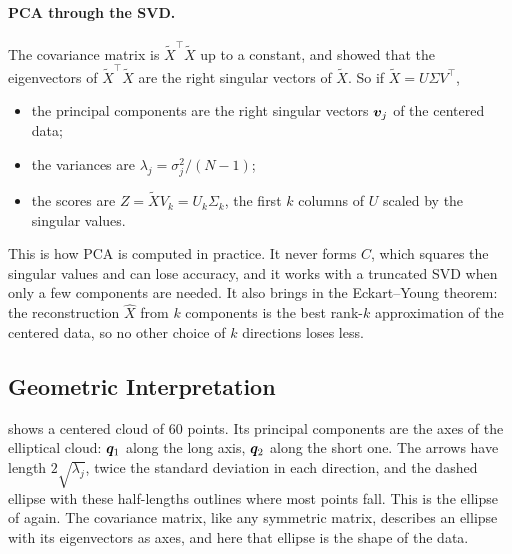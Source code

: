 \paragraph{PCA through the SVD.}
The covariance matrix is $\tilde{X}^\top \tilde{X}$ up to a constant, and
 showed that the eigenvectors of $\tilde{X}^\top
\tilde{X}$ are the right singular vectors of $\tilde{X}$. So if $\tilde{X} =
U \Sigma V^\top$,
\begin{itemize}
  \item the principal components are the right singular vectors
    $\bm{v}_j$ of the centered data;
  \item the variances are $\lambda_j = \sigma_j^2 / (N - 1)$;
  \item the scores are $Z = \tilde{X} V_k = U_k \Sigma_k$, the first $k$
    columns of $U$ scaled by the singular values.
\end{itemize}
This is how PCA is computed in practice. It never forms $C$, which
squares the singular values and can lose accuracy, and it works with a
truncated SVD when only a few components are needed. It also brings in
the Eckart--Young theorem: the reconstruction $\hat{X}$ from $k$ components
is the best rank-$k$ approximation of the centered data, so no other
choice of $k$ directions loses less.

\subsection{Geometric Interpretation}
\label{sec:ch04-pca-geometry}

 shows a centered cloud of $60$ points. Its principal
components are the axes of the elliptical cloud: $\bm{q}_1$ along the
long axis, $\bm{q}_2$ along the short one. The arrows have length
$2\sqrt{\lambda_j}$, twice the standard deviation in each direction, and
the dashed ellipse with these half-lengths outlines where most points
fall. This is the ellipse of  again. The covariance
matrix, like any symmetric matrix, describes an ellipse with its
eigenvectors as axes, and here that ellipse is the shape of the data.

